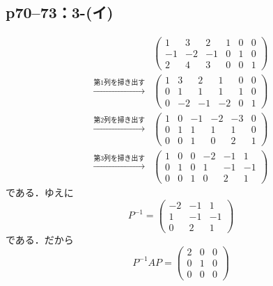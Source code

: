 \documentclass[a4paper,10pt,fleqn]{ltjsarticle}
\begin{document}
\subsection*{p70--73：3-(イ)}

\begin{leftbar}
    \begin{align*}
                                        &
        \left(
        \begin{array}{ccc|ccc}
                1  & 3  & 2  & 1 & 0 & 0 \\
                -1 & -2 & -1 & 0 & 1 & 0 \\
                2  & 4  & 3  & 0 & 0 & 1
            \end{array}
        \right)                           \\
        \xrightarrow{\text{第$1$列を掃き出す}} &
        \left(
        \begin{array}{ccc|ccc}
                1 & 3  & 2  & 1  & 0 & 0 \\
                0 & 1  & 1  & 1  & 1 & 0 \\
                0 & -2 & -1 & -2 & 0 & 1
            \end{array}
        \right)                           \\
        \xrightarrow{\text{第$2$列を掃き出す}} &
        \left(
        \begin{array}{ccc|ccc}
                1 & 0 & -1 & -2 & -3 & 0 \\
                0 & 1 & 1  & 1  & 1  & 0 \\
                0 & 0 & 1  & 0  & 2  & 1
            \end{array}
        \right)                           \\
        \xrightarrow{\text{第$3$列を掃き出す}} &
        \left(
        \begin{array}{ccc|ccc}
                1 & 0 & 0 & -2 & -1 & 1  \\
                0 & 1 & 0 & 1  & -1 & -1 \\
                0 & 0 & 1 & 0  & 2  & 1
            \end{array}
        \right)
    \end{align*}
    である．ゆえに
    \[
        P^{-1} = \begin{pmatrix} -2 & -1 & 1\\ 1 & -1 & -1 \\ 0 & 2 & 1 \end{pmatrix}
    \]
    である．だから
    \[
        P^{-1} A P = \begin{pmatrix} 2 & 0 & 0 \\ 0 & 1 & 0 \\ 0 & 0 & 0 \end{pmatrix}
    \]
\end{leftbar}
\end{document}
